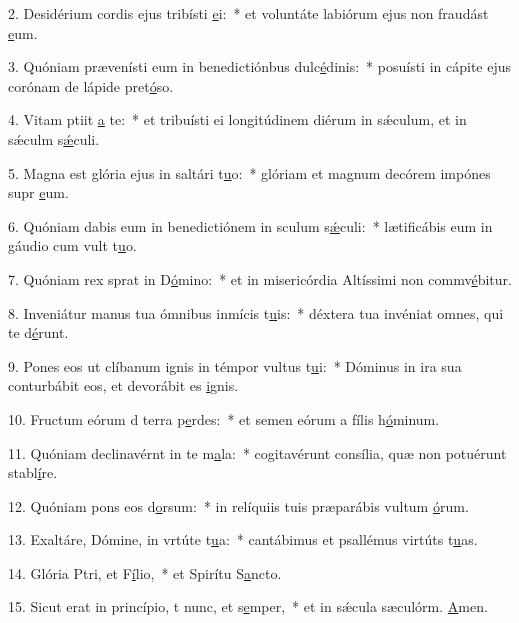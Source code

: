 2. Desidérium cordis ejus tribísti \uline{e}i:~* et voluntáte labiórum ejus non fraudást \uline{e}um.\par 
3. Quóniam prævenísti eum in benedictiónbus dulc\uline{é}dinis:~* posuísti in cápite ejus corónam de lápide pret\uline{ó}so.\par 
4. Vitam ptiit \uline{a} te:~* et tribuísti ei longitúdinem diérum in sǽculum, et in sǽculm s\uline{ǽ}culi.\par 
5. Magna est glória ejus in saltári t\uline{u}o:~* glóriam et magnum decórem impónes supr \uline{e}um.\par 
6. Quóniam dabis eum in benedictiónem in sculum s\uline{ǽ}culi:~* lætificábis eum in gáudio cum vult t\uline{u}o.\par 
7. Quóniam rex sprat in D\uline{ó}mino:~* et in misericórdia Altíssimi non commv\uline{é}bitur.\par 
8. Inveniátur manus tua ómnibus inmícis t\uline{u}is:~* déxtera tua invéniat omnes, qui te d\uline{é}runt.\par 
9. Pones eos ut clíbanum ignis in témpor vultus t\uline{u}i:~* Dóminus in ira sua conturbábit eos, et devorábit es \uline{i}gnis.\par 
10. Fructum eórum d terra p\uline{e}rdes:~* et semen eórum a fílis h\uline{ó}minum.\par 
11. Quóniam declinavérnt in te m\uline{a}la:~* cogitavérunt consília, quæ non potuérunt stabl\uline{í}re.\par 
12. Quóniam pons eos d\uline{o}rsum:~* in relíquiis tuis præparábis vultum \uline{ó}rum.\par 
13. Exaltáre, Dómine, in vrtúte t\uline{u}a:~* cantábimus et psallémus virtúts t\uline{u}as.\par 
14. Glória Ptri, et F\uline{í}lio,~* et Spirítu S\uline{a}ncto.\par 
15. Sicut erat in princípio, t nunc, et s\uline{e}mper,~* et in sǽcula sæculórm. \uline{A}men.\par 

